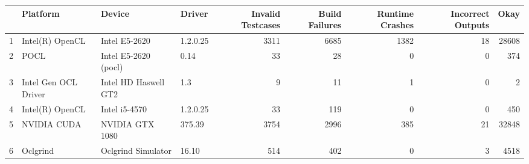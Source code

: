 \begin{tabular}{llllrrrrr}
\toprule
{} &              Platform &                Device &    Driver &  Invalid Testcases &  Build Failures &  Runtime Crashes &  Incorrect Outputs &   Okay \\
\midrule
1 &       Intel(R) OpenCL &         Intel E5-2620 &  1.2.0.25 &               3311 &            6685 &             1382 &                 18 &  28608 \\
2 &                  POCL &  Intel E5-2620 (pocl) &      0.14 &                 33 &              28 &                0 &                  0 &    374 \\
3 &  Intel Gen OCL Driver &  Intel HD Haswell GT2 &       1.3 &                  9 &              11 &                1 &                  0 &      2 \\
4 &       Intel(R) OpenCL &         Intel i5-4570 &  1.2.0.25 &                 33 &             119 &                0 &                  0 &    450 \\
5 &           NVIDIA CUDA &       NVIDIA GTX 1080 &    375.39 &               3754 &            2996 &              385 &                 21 &  32848 \\
6 &              Oclgrind &    Oclgrind Simulator &     16.10 &                514 &             402 &                0 &                  3 &   4518 \\
\bottomrule
\end{tabular}
